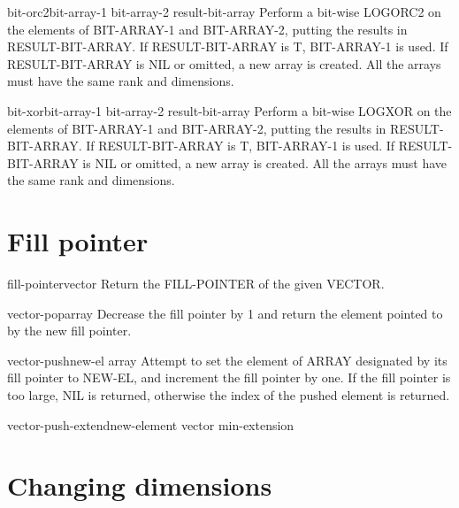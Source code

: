 \documentclass[10pt,english]{book}
\begin{document}
\begin{function}{bit-orc2}{bit-array-1 bit-array-2 \op result-bit-array}
  Perform a bit-wise LOGORC2 on the elements of BIT-ARRAY-1 and BIT-ARRAY-2,
  putting the results in RESULT-BIT-ARRAY. If RESULT-BIT-ARRAY is T,
  BIT-ARRAY-1 is used. If RESULT-BIT-ARRAY is NIL or omitted, a new array is
  created. All the arrays must have the same rank and dimensions.
\end{function}

\begin{function}{bit-xor}{bit-array-1 bit-array-2 \op result-bit-array}
  Perform a bit-wise LOGXOR on the elements of BIT-ARRAY-1 and BIT-ARRAY-2,
  putting the results in RESULT-BIT-ARRAY. If RESULT-BIT-ARRAY is T,
  BIT-ARRAY-1 is used. If RESULT-BIT-ARRAY is NIL or omitted, a new array is
  created. All the arrays must have the same rank and dimensions.
\end{function}

\section{Fill pointer}
\label{sec:fill-pointer}

\begin{accessor}{fill-pointer}{vector}
  Return the FILL-POINTER of the given VECTOR.
\end{accessor}

\begin{function}{vector-pop}{array}
  Decrease the fill pointer by 1 and return the element pointed to by the
  new fill pointer.
\end{function}

\begin{function}{vector-push}{new-el array}
  Attempt to set the element of ARRAY designated by its fill pointer
   to NEW-EL, and increment the fill pointer by one. If the fill pointer is
   too large, NIL is returned, otherwise the index of the pushed element is
   returned.
\end{function}

\begin{function}{vector-push-extend}{new-element vector \op min-extension}
  
\end{function}

\section{Changing dimensions}
\label{sec:changing-dimensions}
\end{document}
